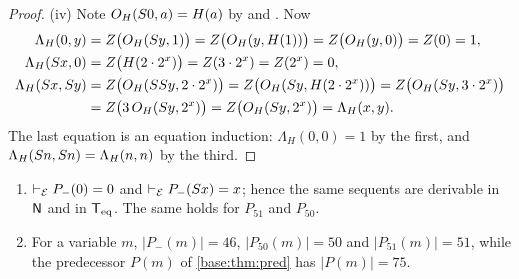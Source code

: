 \begin{proof}
(iv) Note $O_H(S 0,a)=H(a)$ by  and .  Now
\begin{align*}
 \Lambda_H(0,y)&=Z\bigl(O_H(S y,1)\bigr)=Z\bigl(O_H(y,H(1))\bigr)=Z\bigl(O_H(y,0)\bigr)=Z(0)=1,\\
 \Lambda_H(S x,0)&=Z\bigl(H(2\cdot 2^{x})\bigr)=Z(3\cdot 2^{x})=Z(2^{x})=0,\\
 \Lambda_H(S x,S y)&=Z\bigl(O_H(SS y,2\cdot 2^{x})\bigr)
  =Z\bigl(O_H(S y,H(2\cdot 2^{x}))\bigr)=Z\bigl(O_H(S y,3\cdot 2^{x})\bigr)\\
 &=Z\bigl(3\,O_H(S y,2^{x})\bigr)=Z\bigl(O_H(S y,2^{x})\bigr)=\Lambda_H(x,y).
\end{align*}
The last equation is an equation induction: $\Lambda_H(0,0)=1$ by the first,
and $\Lambda_H(S n,S n)=\Lambda_H(n,n)$ by the third.
\end{proof}

\begin{proposition}
\label{base:prop:pred57}
\begin{enumerate}[label=\textup{(\roman*)}]
\item $\vdash_{\mathcal E}P_-(0)=0$ and $\vdash_{\mathcal E}P_-(S x)=x$;
 hence the same sequents are derivable in $\mathsf{N}$ and in $\mathsf{T}_{\mathrm{eq}}$.  The same
 holds for $P_{51}$ and $P_{50}$.
\item For a variable $m$, $|P_-(m)|=46$, $|P_{50}(m)|=50$ and
 $|P_{51}(m)|=51$, while the predecessor $P(m)$ of \cref{base:thm:pred} has
 $|P(m)|=75$.
\end{enumerate}
\end{proposition}

